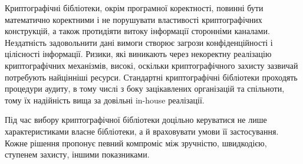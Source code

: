 \documentclass{kpi-lab}
\begin{document}
Криптографічні бібліотеки, окрім програмної коректності,
повинні бути математично коректними і не порушувати властивості
криптографічних конструкцій,
а також протидіяти витоку інформації сторонніми каналами.
Нездатність задовольнити дані вимоги створює загрози
конфіденційності і цілісності інформації.
Ризики, які виникають через некоректну реалізацію криптографічних
механізмів, високі, оскільки криптографічного захисту зазвичай
потребують найцінніші ресурси.
Стандартні криптографічні бібліотеки проходять процедури аудиту,
в тому числі з боку зацікавлених організацій та спільноти,
тому їх надійність вища за довільні in-house реалізації.

Під час вибору криптографічної бібліотеки доцільно керуватися
не лише характеристиками власне бібліотеки, а й враховувати умови її
застосування. Кожне рішення пропонує певний компроміс між
зручністю, швидкодією, ступенем захисту, іншими показниками.

\printbibliography[title={Перелік використаних джерел}]
\end{document}
